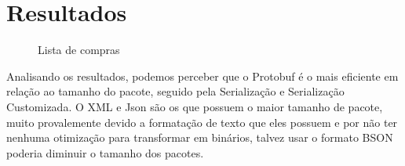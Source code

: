 \documentclass{article}
\begin{document}
\section{Resultados}
\begin{figure}[H]
    \centering
    \caption{Lista de compras}
\end{figure}
Analisando os resultados, podemos perceber que o Protobuf é o mais eficiente em relação ao tamanho do pacote, seguido pela Serialização e Serialização Customizada. 
O XML e Json são os que possuem o maior tamanho de pacote, muito provalemente devido a formatação de texto que eles possuem e por não ter nenhuma otimização para transformar em binários, talvez usar o formato BSON poderia diminuir o tamanho dos pacotes.
\end{document}
